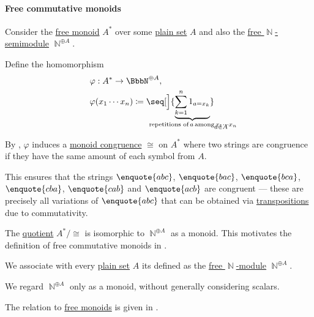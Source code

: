 \paragraph{Free commutative monoids}

\begin{remark}\label{rem:free_commutative_monoid_as_quotient}
  Consider the \hyperref[def:free_monoid]{free monoid} \( A^* \) over some \hyperref[def:set]{plain set} \( A \) and also the \hyperref[def:free_semimodule]{free \( \BbbN \)-semimodule} \( \BbbN^{\oplus A} \).

  Define the homomorphism
  \begin{equation*}
    \begin{aligned}
      &\varphi: A^* \to \BbbN^{\oplus A}, \\
      &\varphi(x_1 \cdots x_n) \coloneqq \seq[\Big]{ \underbrace{\sum_{k=1}^n 1_{a = x_k}}_{\mathclap{\T*{repetitions of} a \T*{among} x_1 \cdots x_n} }}_{a \in A}
    \end{aligned}
  \end{equation*}

  By , \( \varphi \) induces a \hyperref[def:first_order_congruence]{monoid congruence} \( \cong \) on \( A^* \) where two strings are congruence if they have the same amount of each symbol from \( A \).

  This ensures that the strings \( \enquote{abc} \), \( \enquote{bac} \), \( \enquote{bca} \), \( \enquote{cba} \), \( \enquote{cab} \) and \( \enquote{acb} \) are congruent --- these are precisely all variations of \( \enquote{abc} \) that can be obtained via \hyperref[def:transposition]{transpositions} due to commutativity.

  The \hyperref[def:first_order_quotient]{quotient} \( A^* / \cong \) is isomorphic to \( \BbbN^{\oplus A} \) as a monoid. This motivates the definition of free commutative monoids in .
\end{remark}

\begin{definition}\label{def:free_commutative_monoid}\mimprovised
  We associate with every \hyperref[def:set]{plain set} \( A \) its  defined as the \hyperref[def:free_semimodule]{free \( \BbbN \)-module} \( \BbbN^{\oplus A} \).
\end{definition}
\begin{comments}
  \item We regard \( \BbbN^{\oplus A} \) only as a monoid, without generally considering scalars.
  \item The relation to \hyperref[def:free_monoid]{free monoids} is given in .
\end{comments}

